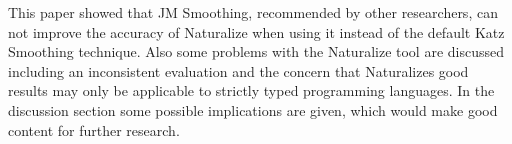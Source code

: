 This paper showed that JM Smoothing, recommended by other researchers, can not improve the accuracy of Naturalize when using it instead of the default Katz Smoothing technique. Also some problems with the Naturalize tool are discussed including an inconsistent evaluation and the concern that Naturalizes good results may only be applicable to strictly typed programming languages. In the discussion section some possible implications are given, which would make good content for further research.
